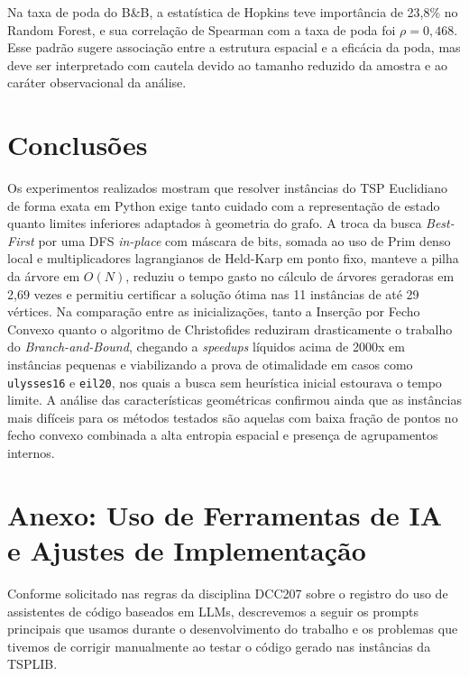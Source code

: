 \documentclass[12pt]{article}
\begin{document}
Na taxa de poda do B\&B, a estatística de Hopkins teve importância de 23,8\% no Random Forest, e sua correlação de Spearman com a taxa de poda foi $\rho=0,468$. Esse padrão sugere associação entre a estrutura espacial e a eficácia da poda, mas deve ser interpretado com cautela devido ao tamanho reduzido da amostra e ao caráter observacional da análise.

\section{Conclusões}

Os experimentos realizados mostram que resolver instâncias do TSP Euclidiano de forma exata em Python exige tanto cuidado com a representação de estado quanto limites inferiores adaptados à geometria do grafo. A troca da busca \textit{Best-First} por uma DFS \textit{in-place} com máscara de bits, somada ao uso de Prim denso local e multiplicadores lagrangianos de Held-Karp em ponto fixo, manteve a pilha da árvore em $O(N)$, reduziu o tempo gasto no cálculo de árvores geradoras em 2,69 vezes e permitiu certificar a solução ótima nas 11 instâncias de até 29 vértices. Na comparação entre as inicializações, tanto a Inserção por Fecho Convexo quanto o algoritmo de Christofides reduziram drasticamente o trabalho do \textit{Branch-and-Bound}, chegando a \textit{speedups} líquidos acima de 2000x em instâncias pequenas e viabilizando a prova de otimalidade em casos como \texttt{ulysses16} e \texttt{eil20}, nos quais a busca sem heurística inicial estourava o tempo limite. A análise das características geométricas confirmou ainda que as instâncias mais difíceis para os métodos testados são aquelas com baixa fração de pontos no fecho convexo combinada a alta entropia espacial e presença de agrupamentos internos.




\newpage
\appendix
\section{Anexo: Uso de Ferramentas de IA e Ajustes de Implementação}

Conforme solicitado nas regras da disciplina DCC207 sobre o registro do uso de assistentes de código baseados em LLMs, descrevemos a seguir os prompts principais que usamos durante o desenvolvimento do trabalho e os problemas que tivemos de corrigir manualmente ao testar o código gerado nas instâncias da TSPLIB.
\end{document}
